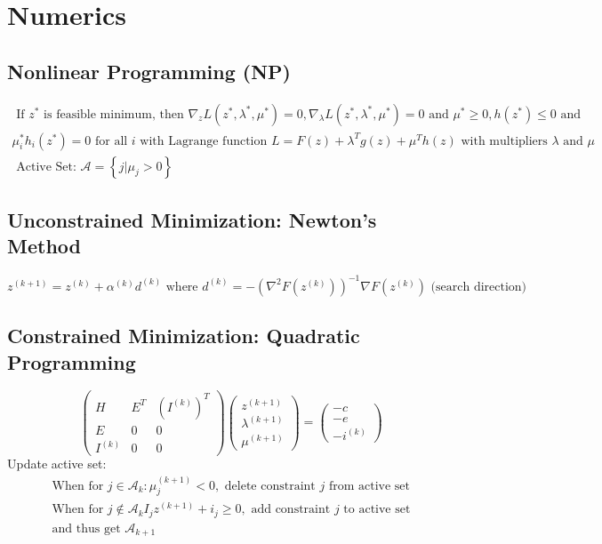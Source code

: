 \documentclass[english]{latex4ei/latex4ei_sheet}
\begin{document}
\section{Numerics}
\begin{sectionbox}

\subsection{Nonlinear Programming (NP)}
$$
\begin{array}{l}{\text { If } z^{*} \text { is feasible minimum, then } \nabla_{z} L\left(z^{*}, \lambda^{*}, \mu^{*}\right)=0, \nabla_{\lambda} L\left(z^{*}, \lambda^{*}, \mu^{*}\right)=0 \text { and } \mu^{*} \geq 0, h\left(z^{*}\right) \leq 0 \text { and }} \\ {\mu_{i}^{*} h_{i}\left(z^{*}\right)=0 \text { for all } i \text { with Lagrange function } L=F(z)+\lambda^{T} g(z)+\mu^{T} h(z) \text { with multipliers } \lambda \text { and } \mu} \\ {\text { Active Set: } \mathcal{A}=\left\{j | \mu_{j}>0\right\}}\end{array}
$$

\subsection{Unconstrained Minimization: Newton's Method}
$$
z^{(k+1)}=z^{(k)}+\alpha^{(k)} d^{(k)} \text { where } d^{(k)}=-\left(\nabla^{2} F\left(z^{(k)}\right)\right)^{-1} \nabla F\left(z^{(k)}\right) \text { (search direction) }
$$

\subsection{Constrained Minimization: Quadratic Programming}
$$
\left(\begin{array}{ccc}{H} & {E^{T}} & {\left(I^{(k)}\right)^{T}} \\ {E} & {0} & {0} \\ {I^{(k)}} & {0} & {0}\end{array}\right)\left(\begin{array}{l}{z^{(k+1)}} \\ {\lambda^{(k+1)}} \\ {\mu^{(k+1)}}\end{array}\right)=\left(\begin{array}{c}{-c} \\ {-e} \\ {-i^{(k)}}\end{array}\right)
$$
Update active set:
$$
\begin{array}{l}{\text { When for } j \in \mathcal{A}_{k}: \mu_{j}^{(k+1)}<0, \text { delete constraint } j \text { from active set }} \\ {\text { When for } j \notin \mathcal{A}_{k} I_{j} z^{(k+1)}+i_{j} \geq 0, \text { add constraint } j \text { to active set }} \\ {\text { and thus get } \mathcal{A}_{k+1}}\end{array}
$$


\end{sectionbox}
\end{document}
